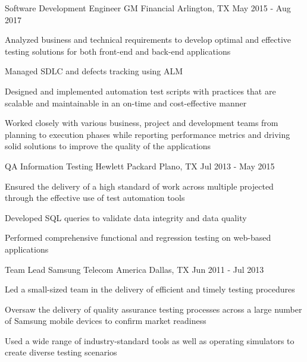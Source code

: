 \begin{cventries}
  \cventry
    {Software Development Engineer} %
    {GM Financial} %
    {Arlington, TX} %
    {May 2015 - Aug 2017} %
    {
      \begin{cvitems} %
        \item {Analyzed business and technical requirements to develop optimal and effective testing solutions for both front-end and back-end applications}
        \item {Managed SDLC and defects tracking using ALM}
        \item {Designed and implemented automation test scripts with practices that are scalable and maintainable in an on-time and cost-effective manner}
        \item {Worked closely with various business, project and development teams from planning to execution phases while reporting performance metrics and driving solid solutions to improve the quality of the applications}
      \end{cvitems}
    }

  \cventry
    {QA Information Testing} %
    {Hewlett Packard} %
    {Plano, TX} %
    {Jul 2013 - May 2015} %
    {
      \begin{cvitems} %
        \item {Ensured the delivery of a high standard of work across multiple projected through the effective use of test automation tools}
        \item {Developed SQL queries to validate data integrity and data quality}
        \item {Performed comprehensive functional and regression testing on web-based applications}
      \end{cvitems}
    }

  \cventry
    {Team Lead} %
    {Samsung Telecom America} %
    {Dallas, TX} %
    {Jun 2011 - Jul 2013} %
    {
      \begin{cvitems} %
        \item {Led a small-sized team in the delivery of efficient and timely testing procedures}
        \item {Oversaw the delivery of quality assurance testing processes across a large number of Samsung mobile devices to confirm market readiness}
        \item {Used a wide range of industry-standard tools as well as operating simulators to create diverse testing scenarios}
      \end{cvitems}
    }

\end{cventries}
